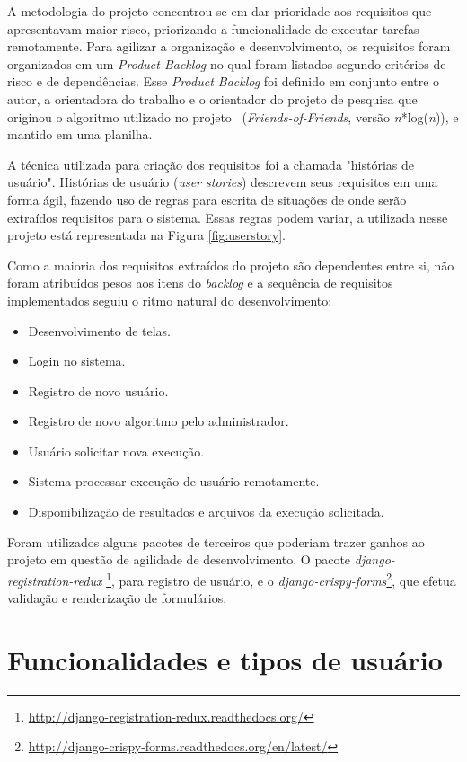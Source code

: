 \documentclass[tg]{mdtufsm}
\begin{document}
A metodologia do projeto concentrou-se em dar prioridade aos requisitos que apresentavam maior risco, priorizando a funcionalidade de executar tarefas remotamente. Para agilizar a organização e desenvolvimento, os requisitos foram organizados em um \emph{Product Backlog} no qual foram listados segundo critérios de risco e de dependências. Esse \emph{Product Backlog} foi definido em conjunto entre o autor, a orientadora do trabalho e o orientador do projeto de pesquisa que originou o algoritmo utilizado no projeto ~(\emph{Friends-of-Friends}, versão \emph{n}*log(\emph{n})), e mantido em uma planilha.

A técnica utilizada para criação dos requisitos foi a chamada "histórias de usuário". Histórias de usuário (\emph{user stories}) descrevem seus requisitos em uma forma ágil, fazendo uso de regras para escrita de situações de onde serão extraídos requisitos para o sistema. Essas regras podem variar, a utilizada nesse projeto está representada na Figura \ref{fig:userstory}.

Como a maioria dos requisitos extraídos do projeto são dependentes entre si, não foram atribuídos pesos aos itens do \emph{backlog} e a sequência de requisitos implementados seguiu o ritmo natural do desenvolvimento:
\begin{itemize}
	\item Desenvolvimento de telas.
	\item Login no sistema.
	\item Registro de novo usuário.
	\item Registro de novo algoritmo pelo administrador.
	\item Usuário solicitar nova execução.
	\item Sistema processar execução de usuário remotamente.
	\item Disponibilização de resultados e arquivos da execução solicitada.
\end{itemize}

Foram utilizados alguns pacotes de terceiros que poderiam trazer ganhos ao projeto em questão de agilidade de desenvolvimento. O pacote \emph{django-registration-redux} \footnote{\url{http://django-registration-redux.readthedocs.org/}}, para registro de usuário, e o \emph{django-crispy-forms}\footnote{\url{http://django-crispy-forms.readthedocs.org/en/latest/}}, que efetua validação e renderização de formulários.

\section{Funcionalidades e tipos de usuário}
\end{document}

